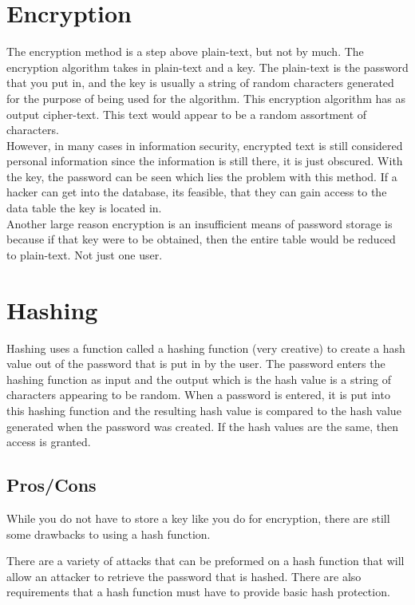 \documentclass[12pt]{article}
\begin{document}
\section{Encryption}
The encryption method is a step above plain-text, but not by much. The encryption algorithm takes in plain-text and a key. The plain-text is the password that you put in, and the key is usually a string of random characters generated for the purpose of being used for the algorithm. This encryption algorithm has as output cipher-text. This text would appear to be a random assortment of characters. \\
However, in many cases in information security, encrypted text is still considered personal information since the information is still there, it is just obscured. With the key, the password can be seen which lies the problem with this method. If a hacker can get into the database, its feasible, that they can gain access to the data table the key is located in.\\
Another large reason encryption is an insufficient means of password storage is because if that key were to be obtained, then the entire table would be reduced to plain-text. Not just one user. 
\section{Hashing}
Hashing uses a function called a hashing function (very creative) to create a hash value out of the password that is put in by the user. The password enters the hashing function as input and the output which is the hash value is a string of characters appearing to be random. When a password is entered, it is put into this hashing function and the resulting hash value is compared to the hash value generated when the password was created. If the hash values are the same, then access is granted. 

\subsection{\indent Pros/Cons}
While you do not have to store a key like you do for encryption, there are still some drawbacks to using a hash function.

There are a variety of attacks that can be preformed on a hash function that will allow an attacker to retrieve the password that is hashed. There are also requirements that a hash function must have to provide basic hash protection.
\end{document}

